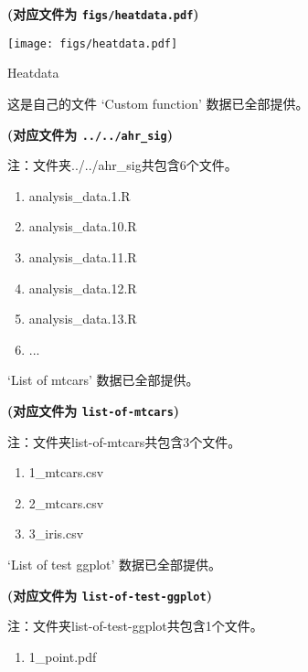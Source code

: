 \documentclass[
]{article}
\providecommand{\tightlist}{%
  \setlength{\itemsep}{0pt}\setlength{\parskip}{0pt}}
\begin{document}
\textbf{(对应文件为 \texttt{figs/heatdata.pdf})}

\def\@captype{figure}
\begin{center}
\texttt{[image: figs/heatdata.pdf]}
\caption{Heatdata}\label{fig:heatdata}
\end{center}

这是自己的文件
`Custom function' 数据已全部提供。

\textbf{(对应文件为 \texttt{../../ahr\_sig})}

\begin{center}\begin{tcolorbox}[colback=gray!10, colframe=gray!50, width=0.9\linewidth, arc=1mm, boxrule=0.5pt]注：文件夹../../ahr\_sig共包含6个文件。

\begin{enumerate}\tightlist
\item analysis\_data.1.R
\item analysis\_data.10.R
\item analysis\_data.11.R
\item analysis\_data.12.R
\item analysis\_data.13.R
\item ...
\end{enumerate}\end{tcolorbox}
\end{center}

`List of mtcars' 数据已全部提供。

\textbf{(对应文件为 \texttt{list-of-mtcars})}

\begin{center}\begin{tcolorbox}[colback=gray!10, colframe=gray!50, width=0.9\linewidth, arc=1mm, boxrule=0.5pt]注：文件夹list-of-mtcars共包含3个文件。

\begin{enumerate}\tightlist
\item 1\_mtcars.csv
\item 2\_mtcars.csv
\item 3\_iris.csv
\end{enumerate}\end{tcolorbox}
\end{center}

`List of test ggplot' 数据已全部提供。

\textbf{(对应文件为 \texttt{list-of-test-ggplot})}

\begin{center}\begin{tcolorbox}[colback=gray!10, colframe=gray!50, width=0.9\linewidth, arc=1mm, boxrule=0.5pt]注：文件夹list-of-test-ggplot共包含1个文件。

\begin{enumerate}\tightlist
\item 1\_point.pdf
\end{enumerate}\end{tcolorbox}
\end{center}
\end{document}
